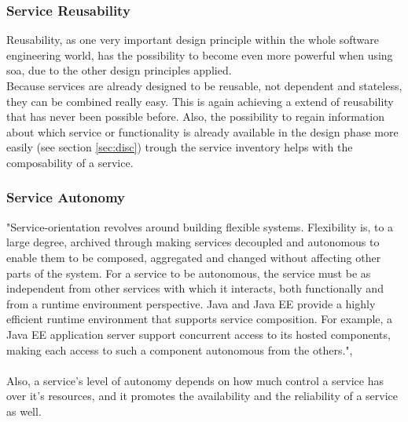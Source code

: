 \documentclass[12pt]{article}
\begin{document}
\subsubsection{Service Reusability}
Reusability, as one very important design principle within the whole software engineering world, has the possibility to become even more powerful when using \gls{soa}, due to the other design principles applied. \\  Because services are already designed to be reusable, not dependent and stateless, they can be combined really easy. This is again achieving a extend of reusability that has never been possible before. Also, the possibility to regain information about which service or functionality is already available in the design phase more easily (see section \ref{sec:disc}) trough the service inventory helps with the composability of a service. \cite[page 87-88]{te}
\newpage
\subsubsection{Service Autonomy}
"Service-orientation revolves around building flexible systems. Flexibility is, to a large degree, archived through making services decoupled and autonomous to enable them to be composed, aggregated and changed without affecting other parts of the system. For a service to be autonomous, the service must be as independent from other services with which it interacts, both functionally and from a runtime environment perspective. Java and Java EE provide a highly efficient runtime environment that supports service composition. For example, a Java EE application server support concurrent access to its hosted components, making each access to such a component autonomous from the others.", \cite[page 194]{grau}\\\\
Also, a service's level of autonomy depends on how much control a service has over it's resources, and it promotes the availability and the reliability of a service as well. \cite[page 88]{te}
\end{document}
